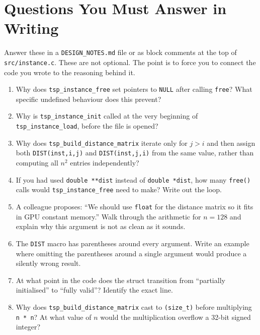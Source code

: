 \section{Questions You Must Answer in Writing}

Answer these in a \texttt{DESIGN\_NOTES.md} file or as block comments at the top of \texttt{src/instance.c}. These are not optional. The point is to force you to connect the code you wrote to the reasoning behind it.

\begin{enumerate}[label=\textbf{Q\arabic*.}, leftmargin=*, itemsep=6pt]
  \item Why does \texttt{tsp\_instance\_free} set pointers to \texttt{NULL} after calling \texttt{free}? What specific undefined behaviour does this prevent?

  \item Why is \texttt{tsp\_instance\_init} called at the very beginning of \texttt{tsp\_instance\_load}, before the file is opened?

  \item Why does \texttt{tsp\_build\_distance\_matrix} iterate only for $j > i$ and then assign both \texttt{DIST(inst,i,j)} and \texttt{DIST(inst,j,i)} from the same value, rather than computing all $n^2$ entries independently?

  \item If you had used \texttt{double **dist} instead of \texttt{double *dist}, how many \texttt{free()} calls would \texttt{tsp\_instance\_free} need to make? Write out the loop.

  \item A colleague proposes: ``We should use \texttt{float} for the distance matrix so it fits in GPU constant memory.'' Walk through the arithmetic for $n = 128$ and explain why this argument is not as clean as it sounds.

  \item The \texttt{DIST} macro has parentheses around every argument. Write an example where omitting the parentheses around a single argument would produce a silently wrong result.

  \item At what point in the code does the struct transition from ``partially initialised'' to ``fully valid''? Identify the exact line.

  \item Why does \texttt{tsp\_build\_distance\_matrix} cast to \texttt{(size\_t)} before multiplying \texttt{n * n}? At what value of $n$ would the multiplication overflow a 32-bit signed integer?
\end{enumerate}

